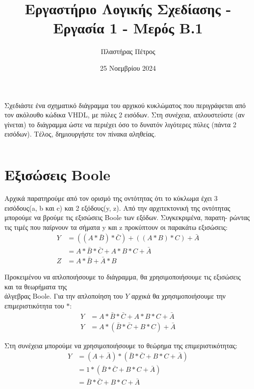 \documentclass[]{article}
\begin{document}
\author{Πλαστήρας Πέτρος}
\title{Εργαστήριο Λογικής Σχεδίασης - Εργασία 1 - Μερός Β.1}
\date{25 Νοεμβρίου 2024}
\maketitle

Σχεδιάστε ένα σχηματικό διάγραμμα του αρχικού κυκλώματος που
περιγράφεται από τον ακόλουθο κώδικα VHDL, με πύλες 2 εισόδων. Στη συνέχεια,
απλουστεύστε (αν γίνεται) το διάγραμμα ώστε να περιέχει όσο το δυνατόν λιγότερες
πύλες (πάντα 2 εισόδων). Τέλος, δημιουργήστε τον πίνακα αληθείας.

\inputminted{vhdl}{./b1_prompt.vhdl}

\section{Εξισώσεις Boole}
Αρχικά παρατηρούμε από τον ορισμό της οντότητας ότι το κύκλωμα έχει 3 εισόδους(a, b και c) και 2 εξόδους(y, z).
Από την αρχιτεκτονική της οντότητας μπορούμε να βρούμε τις εξισώσεις Boole των εξόδων.
Συγκεκριμένα, παρατη- ρώντας τις τιμές που παίρνουν τα σήματα y και z προκύπτουν οι παρακάτω εξισώσεις:
\begin{align*}
	Y & = ((A * \bar{B}) * \bar{C}) + ((A * B) * C) + \bar{A} \\
	  & = A * \bar{B} * \bar{C} + A * B * C + \bar{A}         \\
	Z & = A * \bar{B} + \bar{A} * B
\end{align*}

Προκειμένου να απλοποιήσουμε το διάγραμμα, θα χρησιμοποιήσουμε τις εξισώσεις και τα θεωρήματα της\\
άλγεβρας Boole. Για την απλοποίηση του $Y$ αρχικά θα χρησιμοποιήσουμε την επιμεριστικότητα του $*$:
\begin{align*}
	Y & = A * \bar{B} * \bar{C} + A * B * C + \bar{A} \\
	Y & = A * (\bar{B} * \bar{C} + B * C) + \bar{A}
\end{align*}

Στη συνέχεια μπορούμε να χρησιμοποιήσουμε το θεώρημα της επιμεριστικότητας:
\begin{align*}
	Y & = (A + \bar{A}) * (\bar{B} * \bar{C} + B * C + \bar{A}) \\
	  & = 1 * (\bar{B} * \bar{C} + B * C + \bar{A})             \\
	  & = \bar{B} * \bar{C} + B * C + \bar{A}
\end{align*}
\end{document}

